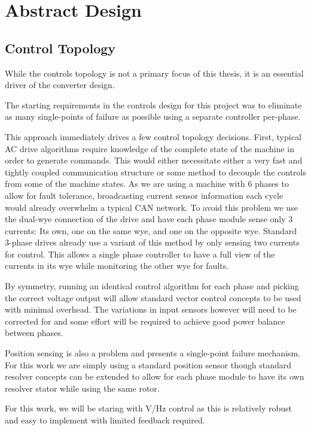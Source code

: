 \chapter{Abstract Design}

\section{Control Topology}
While the controls topology is not a primary focus of this thesis, it is an
essential driver of the converter design.

The starting requirements in the controls design for this project was to
eliminate as many single-points of failure as possible using a separate
controller per-phase.

This approach immediately drives a few control topology decisions.  First,
typical AC drive algorithms require knowledge of the complete state of the
machine in order to generate commands.
This would either necessitate either a very fast and tightly coupled
communication structure or some method to decouple the controls from some of
the machine states.
As we are using a machine with 6 phases to allow for fault tolerance,
broadcasting current sensor information each cycle would already overwhelm a
typical CAN network.
To avoid this problem we use the dual-wye connection of the drive and have
each phase module sense only 3 currents: Its own, one on the same wye, and one
on the opposite wye.
Standard 3-phase drives already use a variant of this method by only sensing
two currents for control.
This allows a single phase controller to have a full view of the currents in
its wye while monitoring the other wye for faults.

By symmetry, running an identical control algorithm for each phase and picking
the correct voltage output will allow standard vector control concepts to be
used with minimal overhead.
The variations in input sensors however will need to be corrected for and some
effort will be required to achieve good power balance between phases.

Position sensing is also a problem and presents a single-point failure
mechanism.
For this work we are simply using a standard position sensor though standard
resolver concepts can be extended to allow for each phase module to have its
own resolver stator while using the same rotor.

For this work, we will be staring with V/Hz control as this is relatively
robust and easy to implement with limited feedback required.


